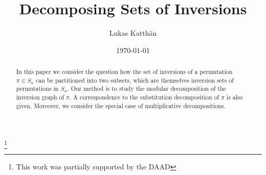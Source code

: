\documentclass{amsart}
\makeatletter
\theoremstyle{plain}
{
	\newtheorem{{lemma}}{{Lemma}}[section]
	\labelformat{{lemma}}{{Lemma}##}
}
{
	\newtheorem{{theorem}}{{Theorem}}[section]
	\labelformat{{theorem}}{{Theorem}##}
}
{	\@namedef{c@{theorem}}{\@nameuse{c@{lemma}}}}
{
	\newtheorem{{corollary}}{{Corollary}}[section]
	\labelformat{{corollary}}{{Corollary}##}
}
{	\@namedef{c@{corollary}}{\@nameuse{c@{lemma}}}}
{
	\newtheorem{{proposition}}{{Proposition}}[section]
	\labelformat{{proposition}}{{Proposition}##}
}
{	\@namedef{c@{proposition}}{\@nameuse{c@{lemma}}}}
{
	\newtheorem{{algorithm}}{{Construction}}[section]
	\labelformat{{algorithm}}{{Construction}##}
}
{	\@namedef{c@{algorithm}}{\@nameuse{c@{lemma}}}}
\theoremstyle{definition}
{
	\newtheorem{{definition}}{{Definition}}[section]
	\labelformat{{definition}}{{Definition}##}
}
{	\@namedef{c@{definition}}{\@nameuse{c@{lemma}}}}
{
	\newtheorem{{problem}}{{Problem}}[section]
	\labelformat{{problem}}{{Problem}##}
}
{	\@namedef{c@{problem}}{\@nameuse{c@{lemma}}}}
\makeatother
\begin{document}
\title{Decomposing Sets of Inversions}
\author{Lukas Katth\"an}
\address{Fachbereich Mathematik und Informatik, Philipps-Universit\"at Marburg 
}\thanks{This work was partially supported by the DAAD}

\date{\today}
 
\begin{abstract}
In this paper we consider the question how the set of inversions of a permutation $\pi \in S_n$ can be partitioned into two subsets, which are themselves inversion sets of permutations in $S_n$.
Our method is to study the modular decomposition of the inversion graph of $\pi$.
A correspondence to the substitution decomposition of $\pi$ is also given.
Moreover, we consider the special case of multiplicative decompositions.
\end{abstract}
\maketitle
\end{document}
